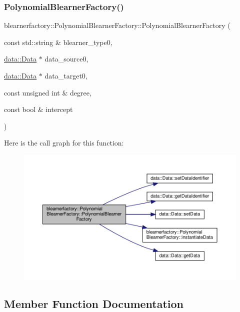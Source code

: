 \subsubsection{\texorpdfstring{Polynomial\+Blearner\+Factory()}{PolynomialBlearnerFactory()}}
{\footnotesize\ttfamily blearnerfactory\+::\+Polynomial\+Blearner\+Factory\+::\+Polynomial\+Blearner\+Factory (\begin{DoxyParamCaption}\item[{const std\+::string \&}]{blearner\+\_\+type0,  }\item[{\mbox{\hyperlink{classdata_1_1_data}{data\+::\+Data}} $\ast$}]{data\+\_\+source0,  }\item[{\mbox{\hyperlink{classdata_1_1_data}{data\+::\+Data}} $\ast$}]{data\+\_\+target0,  }\item[{const unsigned int \&}]{degree,  }\item[{const bool \&}]{intercept }\end{DoxyParamCaption})}

Here is the call graph for this function\+:\nopagebreak
\begin{figure}[H]
\begin{center}
\leavevmode
\includegraphics[width=350pt]{classblearnerfactory_1_1_polynomial_blearner_factory_a4db6750e7534eb7731cc3d60350d91cf_cgraph}
\end{center}
\end{figure}


\subsection{Member Function Documentation}
\mbox{\label{classblearnerfactory_1_1_polynomial_blearner_factory_ac0c7f742da0a2de444e91a0cfb0a9384}} 
